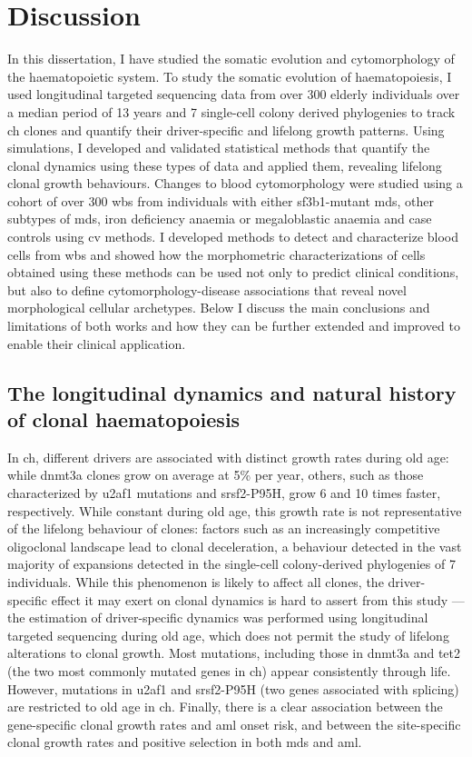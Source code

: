 \chapter{Discussion}

In this dissertation, I have studied the somatic evolution and cytomorphology of the haematopoietic system. To study the somatic evolution of haematopoiesis, I used longitudinal targeted sequencing data from over 300 elderly individuals over a median period of 13 years and 7 single-cell colony derived phylogenies to track \ac{ch} clones and quantify their driver-specific and lifelong growth patterns. Using simulations, I developed and validated statistical methods that quantify the clonal dynamics using these types of data and applied them, revealing lifelong clonal growth behaviours. Changes to blood cytomorphology were studied using a cohort of over 300 \ac{wbs} from individuals with either \ac{sf3b1}-mutant \ac{mds}, other subtypes of \ac{mds}, iron deficiency anaemia or megaloblastic anaemia and case controls using \ac{cv} methods. I developed methods to detect and characterize blood cells from \ac{wbs} and showed how the morphometric characterizations of cells obtained using these methods can be used not only to predict clinical conditions, but also to define cytomorphology-disease associations that reveal novel morphological cellular archetypes. Below I discuss the main conclusions and limitations of both works and how they can be further extended and improved to enable their clinical application. 

\section{The longitudinal dynamics and natural history of clonal haematopoiesis} 

In \ac{ch}, different drivers are associated with distinct growth rates during old age: while \ac{dnmt3a} clones grow on average at 5\% per year, others, such as those characterized by \ac{u2af1} mutations and \ac{srsf2}-P95H, grow 6 and 10 times faster, respectively. While constant during old age, this growth rate is not representative of the lifelong behaviour of clones: factors such as an increasingly competitive oligoclonal landscape lead to clonal deceleration, a behaviour detected in the vast majority of expansions detected in the single-cell colony-derived phylogenies of 7 individuals. While this phenomenon is likely to affect all clones, the driver-specific effect it may exert on clonal dynamics is hard to assert from this study --- the estimation of driver-specific dynamics was performed using longitudinal targeted sequencing during old age, which does not permit the study of lifelong alterations to clonal growth. Most mutations, including those in \ac{dnmt3a} and \ac{tet2} (the two most commonly mutated genes in \ac{ch}) appear consistently through life. However, mutations in \ac{u2af1} and \ac{srsf2}-P95H (two genes associated with splicing) are restricted to old age in \ac{ch}. Finally, there is a clear association between the gene-specific clonal growth rates and \ac{aml} onset risk, and between the site-specific clonal growth rates and positive selection in both \ac{mds} and \ac{aml}.

